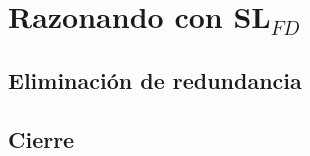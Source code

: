 \section{Razonando con \(\textbf{SL}_{FD}\)}


%  

\subsection{Eliminaci\'on de redundancia}

 
\newpage

\subsection{Cierre}

 
\newpage


%  


%  


%  


%  


\newpage